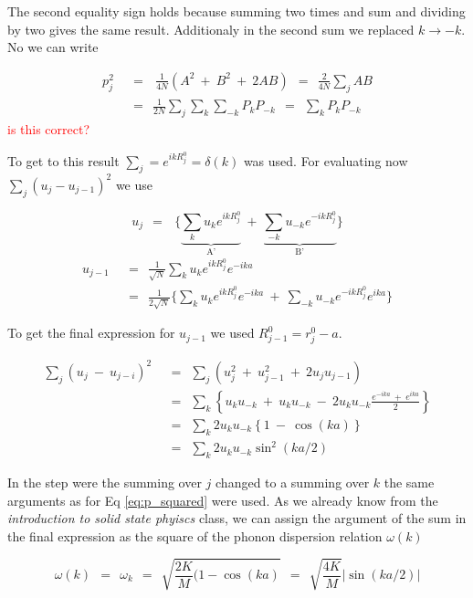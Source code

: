 \documentclass[10pt]{report}
\numberwithin{equation}{chapter}
\newcommand{\refEq}[1]{
  Eq  \ref{#1}
}
\begin{document}
The second equality sign holds because summing two times and sum and dividing by two gives the same result. Additionaly in the second sum we replaced $k \rightarrow -k$. No we can write

\begin{align}\label{eq:p_squared}
  p_j^2 ~~& =~~~\frac{1}{4N} \left( A^2 ~+~ B^2 ~+~ 2AB \right)
  ~~=~~ \frac{2}{4N} \sum_j AB \nonumber \\
  ~~& =~~ \frac{1}{2N} \sum_j \sum_k \sum_{-k} P_k P_{-k}
  ~~=~~ \sum_k P_k P_{-k}
\end{align}
\textcolor{red}{is this correct?}

To get to this result $\sum_j = e^{ikR^0_j} = \delta(k)$ was used.
For evaluating now $\sum_j (u_j - u_{j-1})^2$ we use

\begin{equation}
  u_j ~~=~~~\Bigg\{ \underbrace{\sum_k u_k e^{ikR_j^0}}_\text{A'} ~+~
  \underbrace{\sum_{-k} u_{-k} e^{-ikR_j^0}}_\text{B'} \Bigg\}
\end{equation}
\begin{align}
  u_{j-1} ~~& =~~ \frac{1}{\sqrt{N}} \sum_k u_k e^{ikR_j^0} e^{-ika}\nonumber \\
  ~~& =~~ \frac{1}{2\sqrt{N}} \Bigg\{ \sum_k u_k e^{ikR_j^0} e^{-ika} ~+~
  \sum_{-k} u_{-k} e^{-ikR_j^0} e^{ika} \Bigg\}
\end{align}

To get the final expression for $u_{j-1}$ we used $R_{j-1}^0=r_j^0-a$.

\begin{align}
  \sum_j (u_j ~-~ u_{j-i})^2 ~~& =~~ \sum_j (u_j^2 ~+~ u_{j-1}^2 ~+~ 2u_j u_{j-1})\nonumber \\
  ~~& =~~ \sum_k \left\{ u_k u_{-k} ~+~ u_k u_{-k} ~-~ 2u_k u_{-k} \frac{e^{-ika} ~+~ e^{ika}}{2} \right\}\nonumber \\ 
  ~~& =~~ \sum_k 2 u_k u_{-k} \left\{1 ~-~ \cos(ka) \right\}\nonumber \\
  ~~& =~~ \sum_k 2 u_k u_{-k} \sin^2(ka/2)
\end{align}

In the step were the summing over $j$ changed to a summing over $k$ the same arguments as for \refEq{eq:p_squared} were used. As we already know from the \textit{introduction to solid state phyiscs} class, we can assign the argument of the sum in the final expression as the square of the phonon dispersion relation $\omega(k)$

\begin{equation}\label{eq:dispersion_relation}
  \omega(k) ~~=~~ \omega_k ~~=~~  \sqrt{\frac{2K}{M}(1-\cos(ka)} ~~=~~ 
  \sqrt{\frac{4K}{M}} |\sin(ka/2)|
\end{equation}
\end{document}

